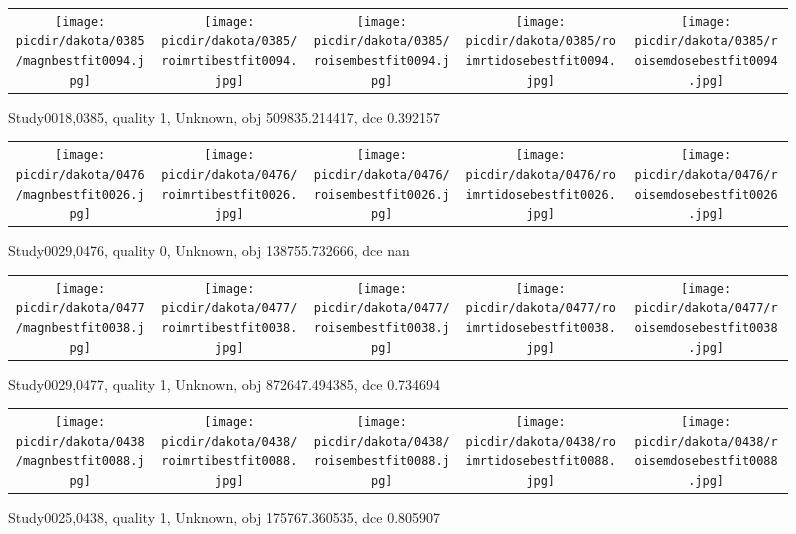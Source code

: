 \documentclass{article}
\newcommand{\picdir}{pdffig}
\begin{document}
\begin{figure} \begin{tabular}{ccccc} \scalebox{0.21}{\texttt{[image: \\picdir/dakota/0385/magnbestfit0094.jpg]}} & \scalebox{0.21}{\texttt{[image: \\picdir/dakota/0385/roimrtibestfit0094.jpg]}} & \scalebox{0.21}{\texttt{[image: \\picdir/dakota/0385/roisembestfit0094.jpg]}}  & \scalebox{0.21}{\texttt{[image: \\picdir/dakota/0385/roimrtidosebestfit0094.jpg]}} & \scalebox{0.21}{\texttt{[image: \\picdir/dakota/0385/roisemdosebestfit0094.jpg]}} \end{tabular} \caption{Study0018,0385, quality 1, Unknown, obj 509835.214417, dce 0.392157  } \label{Study00180385} \end{figure}
\begin{figure} \begin{tabular}{ccccc} \scalebox{0.21}{\texttt{[image: \\picdir/dakota/0476/magnbestfit0026.jpg]}} & \scalebox{0.21}{\texttt{[image: \\picdir/dakota/0476/roimrtibestfit0026.jpg]}} & \scalebox{0.21}{\texttt{[image: \\picdir/dakota/0476/roisembestfit0026.jpg]}}  & \scalebox{0.21}{\texttt{[image: \\picdir/dakota/0476/roimrtidosebestfit0026.jpg]}} & \scalebox{0.21}{\texttt{[image: \\picdir/dakota/0476/roisemdosebestfit0026.jpg]}} \end{tabular} \caption{Study0029,0476, quality 0, Unknown, obj 138755.732666, dce nan  } \label{Study00290476} \end{figure}
\begin{figure} \begin{tabular}{ccccc} \scalebox{0.21}{\texttt{[image: \\picdir/dakota/0477/magnbestfit0038.jpg]}} & \scalebox{0.21}{\texttt{[image: \\picdir/dakota/0477/roimrtibestfit0038.jpg]}} & \scalebox{0.21}{\texttt{[image: \\picdir/dakota/0477/roisembestfit0038.jpg]}}  & \scalebox{0.21}{\texttt{[image: \\picdir/dakota/0477/roimrtidosebestfit0038.jpg]}} & \scalebox{0.21}{\texttt{[image: \\picdir/dakota/0477/roisemdosebestfit0038.jpg]}} \end{tabular} \caption{Study0029,0477, quality 1, Unknown, obj 872647.494385, dce 0.734694  } \label{Study00290477} \end{figure}
\clearpage
\begin{figure} \begin{tabular}{ccccc} \scalebox{0.21}{\texttt{[image: \\picdir/dakota/0438/magnbestfit0088.jpg]}} & \scalebox{0.21}{\texttt{[image: \\picdir/dakota/0438/roimrtibestfit0088.jpg]}} & \scalebox{0.21}{\texttt{[image: \\picdir/dakota/0438/roisembestfit0088.jpg]}}  & \scalebox{0.21}{\texttt{[image: \\picdir/dakota/0438/roimrtidosebestfit0088.jpg]}} & \scalebox{0.21}{\texttt{[image: \\picdir/dakota/0438/roisemdosebestfit0088.jpg]}} \end{tabular} \caption{Study0025,0438, quality 1, Unknown, obj 175767.360535, dce 0.805907  } \label{Study00250438} \end{figure}
\end{document}
